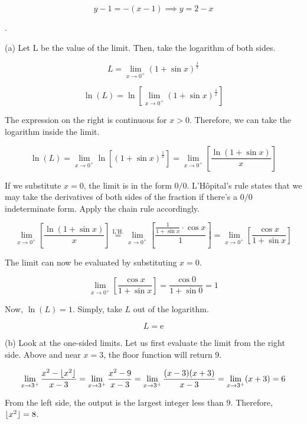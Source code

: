 \documentclass{article}
\DeclarePairedDelimiter\floor{\lfloor}{\rfloor}
\begin{document}
\[y-1=-(x-1)\implies\boxed{y=2-x}\]

\hfill

.

\hfill

\noindent (a) Let L be the value of the limit. Then, take the logarithm of both sides.

\[L = \lim_{x\to 0^+} (1+\sin x)^{\frac{1}{x}}\]

\[\ln(L)=\ln\left[\lim_{x\to 0^+} (1+\sin x)^{\frac{1}{x}}\right]\]

\hfill

\noindent The expression on the right is continuous for $x>0$. Therefore, we can take the logarithm inside the limit.

\[\ln(L)=\lim_{x\to 0^+}\ln\left[(1+\sin x)^{\frac{1}{x}}\right]=\lim_{x\to 0^+}\left[\frac{\ln(1+\sin x)}{x}\right]\]

\hfill

\noindent If we substitute $x=0$, the limit is in the form $0/0$. L'Hôpital's rule states that we may take the derivatives of both sides of the fraction if there's a $0/0$ indeterminate form. Apply the chain rule accordingly.

\[\lim_{x\to 0^+} \left[\frac{\ln(1+\sin x)}{x}\right]\overset{\text{L'H.}}{=}\lim_{x\to 0^+} \left[\frac{\frac{1}{1+\sin x}\cdot\cos x}{1}\right]=\lim_{x\to 0^+}\left[\frac{\cos x}{1+\sin x}\right] \]

\hfill

\noindent The limit can now be evaluated by substituting $x=0$.

\[\lim_{x\to 0^+} \left[\frac{\cos x}{1+\sin x}\right] = \frac{\cos 0}{1 + \sin 0 } =1\]

\hfill

\noindent Now, $\ln(L) = 1$. Simply, take $L$ out of the logarithm.

\[ \boxed{L = \mathrm{e}}\]

\hfill

\noindent (b) Look at the one-sided limits. Let us first evaluate the limit from the right side. Above and near $x=3$, the floor function will return $9$.

\[ \lim_{x\to 3^+} \frac{x^2-\floor{x^2}}{x-3} = \lim_{x\to 3^+}\frac{x^2-9}{x-3} = \lim_{x\to 3^+}\frac{(x-3)(x+3)}{x-3} = \lim_{x\to 3^+}(x+3)= 6\]

\hfill

\noindent From the left side, the output is the largest integer less than $9$. Therefore, $\floor{x^2} = 8$.
\end{document}
